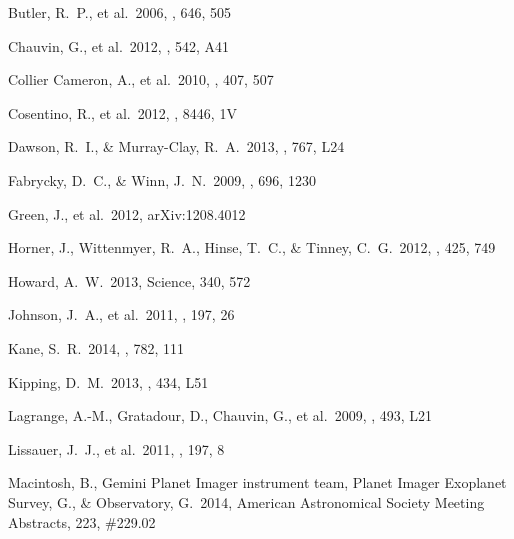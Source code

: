 \documentclass[11pt,preprint]{aastex}
\begin{document}
\begin{CJK*}{UTF8}{gbsn}
\begin{thebibliography}
 Butler, R.~P., et al.\ 2006, 
\apj, 646, 505 %

 Chauvin, G., et al.\ 2012, 
\aap, 542, A41 %

 Collier 
Cameron, A., et al.\ 2010, \mnras, 407, 507 %

 Cosentino, R., et al.\ 
2012, \procspie, 8446, 1V %

 Dawson, R.~I., \&
  Murray-Clay, R.~A.\ 2013, \apjl, 767, L24  %

 Fabrycky, D.~C., \&
  Winn, J.~N.\ 2009, \apj, 696, 1230 %
  
 Green, J., et al.\ 2012, 
arXiv:1208.4012   %

 Horner, J., Wittenmyer, R.~A., 
Hinse, T.~C., \& Tinney, C.~G.\ 2012, \mnras, 425, 749 %

 Howard, A.~W.\ 2013, Science, 340,
  572 %

 Johnson, J.~A., et al.\ 2011, 
\apjs, 197, 26 %
  
 Kane, S.~R.\ 2014, \apj, 782, 111 %
  
 Kipping, D.~M.\ 2013, \mnras,
  434, L51 %

 Lagrange, A.-M., Gratadour, D., Chauvin, G., et al.\ 2009, \aap, 493, L21 %

 Lissauer, J.~J., et al.\ 
2011, \apjs, 197, 8 %

 Macintosh, B., Gemini 
Planet Imager instrument team, Planet Imager Exoplanet Survey, G., 
\& Observatory, G.\ 2014, American Astronomical Society Meeting
Abstracts, 223, \#229.02  %


\end{thebibliography}
\end{CJK*}
\end{document}
